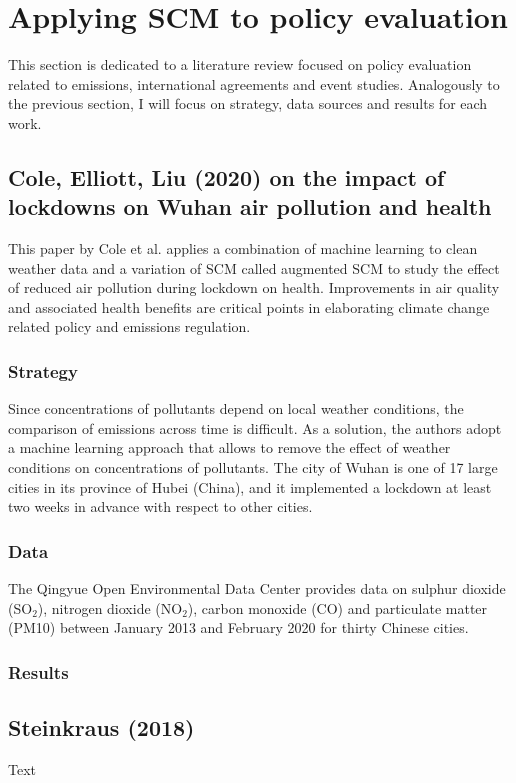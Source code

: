 \documentclass[12pt,a4paper,draft]{article}
\begin{document}
\section{Applying SCM to policy evaluation}
This section is dedicated to a literature review focused on policy evaluation related 
to emissions, international agreements and event studies. Analogously to the previous 
section, I will focus on strategy, data sources and results for each work. 


\subsection{Cole, Elliott, Liu (2020) on the impact of lockdowns on Wuhan air pollution and health}
This paper by Cole et al. applies a combination of machine learning 
to clean weather data and a variation of SCM called augmented SCM to study the effect 
of reduced air pollution during lockdown on health. 
Improvements in air quality and associated health benefits are critical points in 
elaborating climate change related policy and emissions regulation. 


\subsubsection*{Strategy} %
Since concentrations of pollutants depend on local weather conditions, the comparison 
of emissions across time is difficult. As a solution, the authors adopt a machine 
learning approach that allows to remove the effect of weather conditions on concentrations 
of pollutants. 
The city of Wuhan is one of 17 large cities in its province of Hubei (China), and it 
implemented a lockdown at least two weeks in advance with respect to other cities. 

\subsubsection*{Data}
The Qingyue Open Environmental Data Center provides data on sulphur dioxide (SO$_2$), 
nitrogen dioxide (NO$_2$), carbon monoxide (CO) and particulate matter (PM10) between 
January 2013 and February 2020 for thirty Chinese cities. 

\subsubsection*{Results}



\subsection{Steinkraus (2018)}
Text
\end{document}
